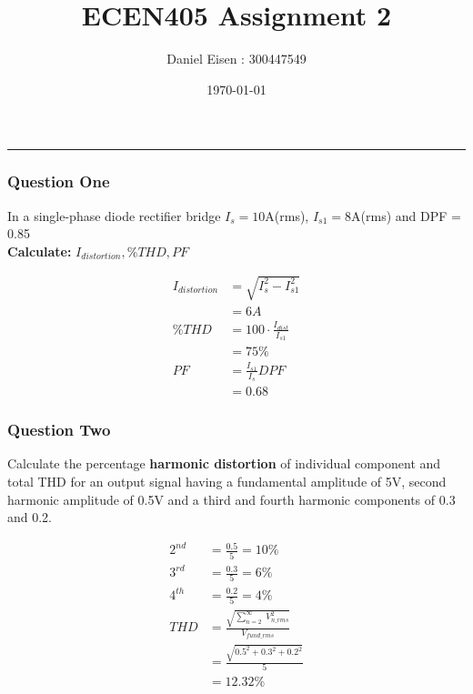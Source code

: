 \documentclass[a4paper,11pt]{article}
\begin{document}
\title{\LARGE{\textbf{ECEN405 Assignment 2}}}
\author{Daniel Eisen : 300447549}
\date{\today}
\maketitle
\hrule

\subsubsection*{Question One}

In a single-phase diode rectifier bridge $I_s = 10$A(rms), $I_{s1}=8$A(rms) and DPF = 0.85\\
\textbf{Calculate:} $I_{distortion}, \%THD, PF$

\begin{align*}
    I_{distortion} & = \sqrt{I_{s}^{2}-I_{s1}^{2}}     \\
                   & = 6A                              \\
    \%THD          & = 100\cdot\frac{I_{dist}}{I_{s1}} \\
                   & = 75\%                            \\
    PF             & = \frac{I_{s1}}{I_{s}}DPF         \\
                   & = 0.68
\end{align*}

\subsubsection*{Question Two}
Calculate the percentage \textbf{harmonic distortion} of individual component and total THD for an output signal having a fundamental amplitude of 5V, second harmonic amplitude of 0.5V and a third and fourth harmonic components of 0.3 and 0.2.

\begin{align*}
    2^{nd} & = \frac{0.5}{5} = 10\%                                                \\
    3^{rd} & = \frac{0.3}{5} = 6\%                                                 \\
    4^{th} & = \frac{0.2}{5} = 4\%                                                 \\
    THD    & = \frac{\sqrt{ \sum_{n=2}^{\infty} \; V^2_{n\_rms} }}{ V_{fund\_rms}} \\
           & = \frac{\sqrt{ 0.5^2 + 0.3^2 + 0.2^2 }}{ 5 }                          \\
           & = 12.32\%
\end{align*}
\end{document}
